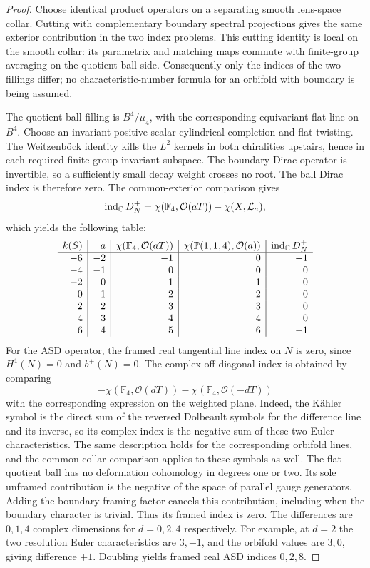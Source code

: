 \begin{proof}
Choose identical product operators on a separating smooth lens-space
collar.  Cutting with complementary boundary spectral projections
gives the same exterior contribution in the two index problems.
This cutting identity is local on the smooth collar: its parametrix
and matching maps commute with finite-group averaging on the
quotient-ball side.  Consequently only the indices of the two
fillings differ; no characteristic-number formula for an orbifold
with boundary is being assumed.

The quotient-ball filling is $B^4/\mu_4$, with the corresponding
equivariant flat line on $B^4$.  Choose an invariant positive-scalar
cylindrical completion and flat twisting.  The Weitzenb\"ock identity
kills the $L^2$ kernels in both chiralities upstairs, hence in each
required finite-group invariant subspace.  The boundary Dirac
operator is invertible, so a sufficiently small decay weight crosses
no root.  The ball Dirac index is therefore zero.  The common-exterior
comparison gives
\[
 \operatorname{ind}_{\mathbb C}D_N^+
 =\chi(\mathbb F_4,\mathcal O(aT))-\chi(X,\mathcal L_a),
\]
which yields the following table:
\begin{equation}\label{eq:indices:dirac-table}
\begin{array}{r|r|r|r|r}
 k(S)&a&\chi(\mathbb F_4,\mathcal O(aT))
 &\chi(\mathbb P(1,1,4),\mathcal O(a))&\operatorname{ind}_{\mathbb C}D_N^+\\ \hline
 -6&-2&-1&0&-1\\
 -4&-1&0&0&0\\
 -2&0&1&1&0\\
 0&1&2&2&0\\
 2&2&3&3&0\\
 4&3&4&4&0\\
 6&4&5&6&-1
\end{array}
\end{equation}
For the ASD operator, the framed real tangential line index on $N$ is zero,
since $H^1(N)=0$ and $b^+(N)=0$.  The complex off-diagonal index is obtained
by comparing
\[
 -\chi(\mathbb F_4,\mathcal O(dT))
 -\chi(\mathbb F_4,\mathcal O(-dT))
\]
with the corresponding expression on the weighted plane.  Indeed,
the K\"ahler symbol is the direct sum of the reversed Dolbeault symbols
for the difference line and its inverse, so its complex index is
the negative sum of these two Euler characteristics.  The same
description holds for the corresponding orbifold lines, and the
common-collar comparison applies to these symbols as well.
The flat quotient ball has no deformation cohomology in degrees
one or two.  Its sole unframed contribution is the negative of the
space of parallel gauge generators.  Adding the boundary-framing
factor cancels this contribution, including when the boundary
character is trivial.  Thus its framed index is zero.  The differences
are $0,1,4$ complex dimensions for $d=0,2,4$ respectively.  For example, at
$d=2$ the two resolution Euler characteristics are $3,-1$, and the
orbifold values are $3,0$, giving difference $+1$.  Doubling yields framed
real ASD indices $0,2,8$.


\end{proof}
